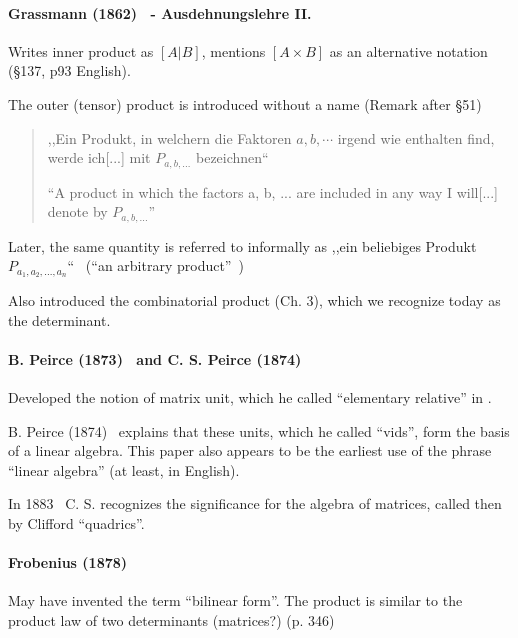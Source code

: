 \paragraph{Grassmann (1862)~\cite{Grassmann1862,Grassmann2000} - Ausdehnungslehre II.}

Writes inner product as $[A | B]$, mentions $[A \times B]$ as an alternative notation (\S 137, p93 English).

The outer (tensor) product is introduced without a name (Remark after \S 51)

\begin{quote}
,,Ein Produkt, in welchern die Faktoren $a, b, \cdots$ irgend wie enthalten find, werde ich[...] mit $P_{a,b,...}$ bezeichnen`` \cite[p. 24, \S 43]{Grassmann1862}

``A product in which the factors a, b, ... are included in any way I will[...] denote by $P_{a,b,...}$''~\cite[p. 22, \S 43]{Grassmann2000}
\end{quote}

Later, the same quantity is referred to informally as
,,ein beliebiges Produkt $P_{a_1, a_2, ..., a_n}$``~\cite[\S 353]{Grassmann1862} (``an arbitrary product''~\cite[p. 196, \S 353]{Grassmann2000})

Also introduced the combinatorial product (Ch. 3), which we recognize today as the determinant.


\paragraph{B. Peirce (1873)~\cite{Peirce1873} and C. S. Peirce (1874)~\cite{Peirce1874}}

Developed the notion of matrix unit, which he called ``elementary relative'' in \cite[p.359]{Peirce1873}.

B. Peirce (1874)~\cite{Peirce1874} explains that these units, which he called ``vids'', form the basis of a linear algebra. This paper also appears to be the earliest use of the phrase ``linear algebra'' (at least, in English).

In 1883~\cite{Peirce1883} C. S. recognizes the significance for the algebra of matrices, called then by Clifford ``quadrics''.

\paragraph{Frobenius (1878)~\cite{Frobenius1878}}

May have invented the term ``bilinear form''.
The product is similar to the product law of two determinants (matrices?) (p. 346)



